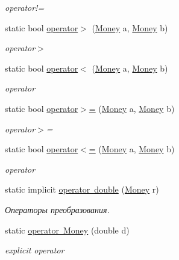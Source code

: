 \begin{DoxyCompactItemize}
\begin{DoxyCompactList}\small\item\em operator!= \end{DoxyCompactList}\item 
static bool \mbox{\hyperlink{struct_f_b_a_1_1_money_a33bc38e2ecdadba63b98437c2fb9dce1}{operator$>$}} (\mbox{\hyperlink{struct_f_b_a_1_1_money}{Money}} a, \mbox{\hyperlink{struct_f_b_a_1_1_money}{Money}} b)
\begin{DoxyCompactList}\small\item\em operator$>$ \end{DoxyCompactList}\item 
static bool \mbox{\hyperlink{struct_f_b_a_1_1_money_ab35ade105db479642dd38db28c2ddea3}{operator$<$}} (\mbox{\hyperlink{struct_f_b_a_1_1_money}{Money}} a, \mbox{\hyperlink{struct_f_b_a_1_1_money}{Money}} b)
\begin{DoxyCompactList}\small\item\em operator \end{DoxyCompactList}\item 
static bool \mbox{\hyperlink{struct_f_b_a_1_1_money_ac7fcecf827119127ff3c48f5c8b327e8}{operator$>$=}} (\mbox{\hyperlink{struct_f_b_a_1_1_money}{Money}} a, \mbox{\hyperlink{struct_f_b_a_1_1_money}{Money}} b)
\begin{DoxyCompactList}\small\item\em operator$>$= \end{DoxyCompactList}\item 
static bool \mbox{\hyperlink{struct_f_b_a_1_1_money_a705bd91312107388336b6b1118b3f02f}{operator$<$=}} (\mbox{\hyperlink{struct_f_b_a_1_1_money}{Money}} a, \mbox{\hyperlink{struct_f_b_a_1_1_money}{Money}} b)
\begin{DoxyCompactList}\small\item\em operator \end{DoxyCompactList}\item 
static implicit \mbox{\hyperlink{struct_f_b_a_1_1_money_a16581c897a0893a484d72900da5615f0}{operator double}} (\mbox{\hyperlink{struct_f_b_a_1_1_money}{Money}} r)
\begin{DoxyCompactList}\small\item\em Операторы преобразования. \end{DoxyCompactList}\item 
static \mbox{\hyperlink{struct_f_b_a_1_1_money_ae8e50658dc1328bb0d3ff8c127c3feb0}{operator Money}} (double d)
\begin{DoxyCompactList}\small\item\em explicit operator \end{DoxyCompactList}\end{DoxyCompactItemize}
